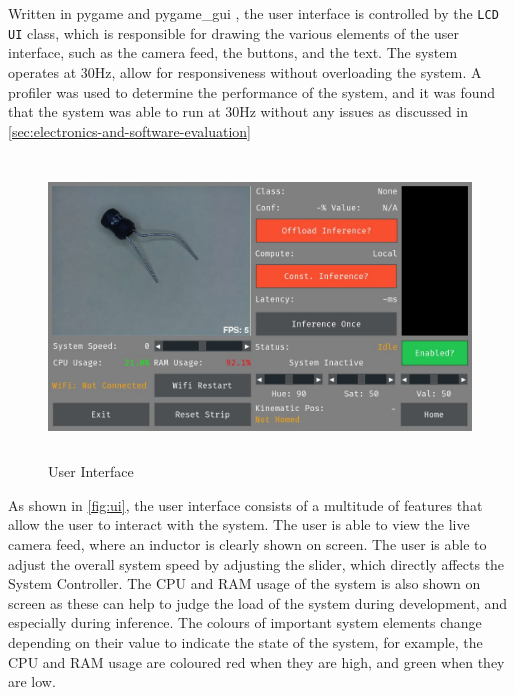 Written in pygame \cite{pygamedoc} and pygame\_gui \cite{pygamegui}, the user interface is controlled by the \texttt{LCD UI} class, which is responsible for drawing the various elements of the user interface, such as the camera feed, the buttons, and the text. The system operates at 30Hz, allow for responsiveness without overloading the system. A profiler was used to determine the performance of the system, and it was found that the system was able to run at 30Hz without any issues as discussed in \autoref{sec:electronics-and-software-evaluation}

\begin{figure}[H]
    \hfill
    \begin{minipage}[t]{\textwidth}
      \centering
      \includegraphics[height=8cm]{imgs/software/screenresistor.jpg}
      \caption{User Interface}
      \label{fig:ui}
    \end{minipage}
\end{figure}

As shown in \autoref{fig:ui}, the user interface consists of a multitude of features that allow the user to interact with the system. The user is able to view the live camera feed, where an inductor is clearly shown on screen. The user is able to adjust the overall system speed by adjusting the slider, which directly affects the System Controller. The CPU and RAM usage of the system is also shown on screen as these can help to judge the load of the system during development, and especially during inference. The colours of important system elements change depending on their value to indicate the state of the system, for example, the CPU and RAM usage are coloured red when they are high, and green when they are low. 

